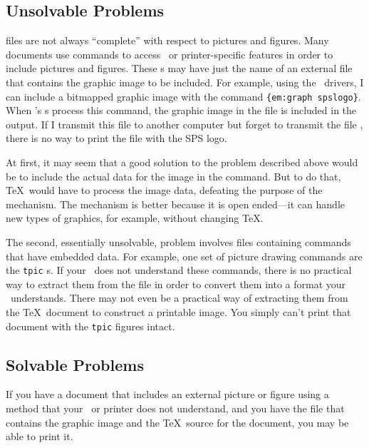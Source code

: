 \subsection{Unsolvable Problems}

 files are not always ``complete'' with respect to pictures
and figures.  Many documents
use  commands to access \dvidriver\ or printer-specific 
features in order to include pictures and figures.  These
s may have just the name of an external file that
contains the graphic image to be included.  For example, 
using the \emTeX\ drivers, I can include a bitmapped graphic image
with the command \verb|{em:graph spslogo}|.  When \emTeX's
\dvidriver{}s process this command, the graphic image in the file
 is included in the output.  If I transmit
this  file to another computer but forget to transmit the
file , there is no way to print the
 file with the SPS logo.

At first, it may seem that a good solution to the problem described
above would be to include the actual data for the image in the
 command.  But to do that, \TeX\ would have to
process the image data, defeating the purpose of the 
mechanism.  The  mechanism is better because it is open
ended---it can handle new types of graphics, for example, without 
changing \TeX.

The second, essentially unsolvable, problem involves
 files containing  commands that
have embedded data.  For example, one set of picture drawing 
commands are the \verb|tpic| s.  If your \dvidriver\
does not understand these commands,
there is no practical way to extract them from the  file
in order to convert them into a format your \dvidriver\ understands.
There may not even be a practical way of extracting them from the \TeX\
document to construct a printable image.
You simply can't print that document with the \verb|tpic| figures intact.

\subsection{Solvable Problems}

If you have a document that includes an external picture or figure
using a method that your \dvidriver\ or printer does not understand,
and you have the file that contains the graphic image and
the \TeX\ source for the document, you may be able to print it.

